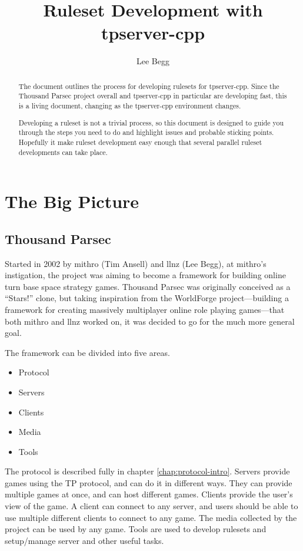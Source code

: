 \documentclass[a4paper,11pt]{report}
\title{Ruleset Development with tpserver-cpp}
\author{Lee Begg}
\begin{document}

\maketitle

\tableofcontents

\begin{abstract}
The document outlines the process for developing rulesets for tpserver-cpp. Since the Thousand Parsec project overall and tpserver-cpp in particular are developing fast, this is a living document, changing as the tpserver-cpp environment changes.

Developing a ruleset is not a trivial process, so this document is designed to guide you through the steps
you need to do and highlight issues and probable sticking points. Hopefully it make ruleset development easy enough that several parallel ruleset developments can take place.
\end{abstract}

\part{The Big Picture}
\label{part:intro}

\chapter{Thousand Parsec}
\label{chap:tp}
Started in 2002 by mithro (Tim Ansell) and llnz (Lee Begg), at mithro's instigation, the project was aiming to become a framework for building online turn base space strategy games. Thousand Parsec was originally conceived as a ``Stars!'' clone, but taking inspiration from the WorldForge project---building a framework for creating massively multiplayer online role playing games---that both mithro and llnz worked on, it was decided to go for the much more general goal.


The framework can be divided into five areas.
\begin{itemize}
 \item Protocol
 \item Servers
 \item Clients
 \item Media
 \item Tools
\end{itemize}

The protocol is described fully in chapter \ref{chap:protocol-intro}. Servers provide games using the TP protocol, and can do it in different ways. They can provide multiple games at once, and can host different games. Clients provide the user's view of the game. A client can connect to any server, and users should be able to use multiple different clients to connect to any game. The media collected by the project can be used by any game. Tools are used to develop rulesets and setup/manage server and other useful tasks.
\end{document}

